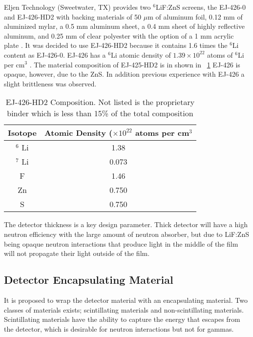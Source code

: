 Eljen Technology (Sweetwater, TX) provides two ${}^6$LiF:ZnS screens, the EJ-426-0 and EJ-426-HD2 with backing materials   of 50 $\mu$m of aluminum foil, 0.12 mm of aluminized mylar, a 0.5 mm aluminum sheet, a 0.4 mm sheet of highly reflective aluminum, and 0.25 mm of clear polyester with the option of a 1 mm acrylic plate \cite{eljen_ej-426_2012}.
It was decided to use EJ-426-HD2 because it contains 1.6 times the ${}^{6}$Li content as EJ-426-0. EJ-426 has a ${}^{6}$Li atomic density of $1.39\times10^{22}$ atoms of ${}^6$Li per cm${}^3$ \cite{eljen_ej-426_2012}. 
The material composition of EJ-425-HD2 is in shown in ~\ref{tab:EJ426Composition}
EJ-426 is opaque, however, due to the ZnS.  In addition previous experience with EJ-426 a slight brittleness was observed.
\begin{table}
    \centering
    \begin{tabular}{c|c}
        Isotope & Atomic Density ($\times 10^{22}$ atoms per cm${}^3$ \\
        \hline
        $ {}^6 $ Li & 1.38 \\
        $ {}^7 $ Li & 0.073 \\
        F & 1.46 \\
        Zn & 0.750 \\
        S & 0.750 \\
    \end{tabular}
    \label{tab:EJ426Composition}
    \caption{EJ-426-HD2 Composition.  Not listed is the proprietary binder which is less than 15\% of the total composition \cite{urffer_ej_2012}}
\end{table}
The detector thickness is a key design parameter. 
Thick detector will have a high neutron efficiency with the large amount of neutron absorber, but due to LiF:ZnS being opaque neutron interactions that produce light in the middle of the film will not propagate their light outside of the film.

\subsection{Detector Encapsulating Material}
It is proposed to wrap the detector material with an encapsulating material.
Two classes of materials exists; scintillating materials and non-scintillating materials.  
Scintillating materials have the ability to capture the energy that escapes from the detector, which is desirable for neutron interactions but not for gammas.


